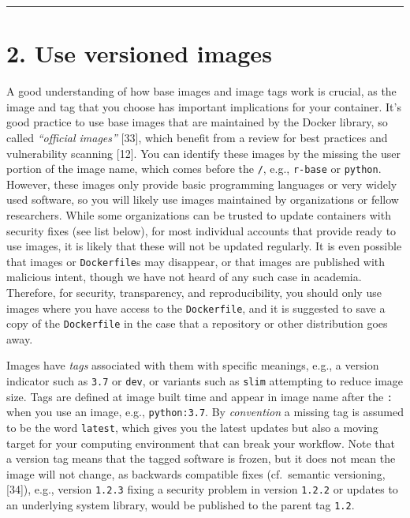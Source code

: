 \documentclass[10pt,letterpaper]{article}
\begin{document}
\begin{center}\rule{0.5\linewidth}{0.5pt}\end{center}

\hypertarget{use-versioned-images}{%
\section*{2. Use versioned images}\label{use-versioned-images}}

  \label{rule:base} 

A good understanding of how base images and image tags work is crucial,
as the image and tag that you choose has important implications for your
container. It's good practice to use base images that are maintained by
the Docker library, so called \emph{``official images''} {[}33{]}, which
benefit from a review for best practices and vulnerability scanning
{[}12{]}. You can identify these images by the missing the user portion
of the image name, which comes before the \texttt{/}, e.g.,
\texttt{r-base} or \texttt{python}. However, these images only provide
basic programming languages or very widely used software, so you will
likely use images maintained by organizations or fellow researchers.
While some organizations can be trusted to update containers with
security fixes (see list below), for most individual accounts that
provide ready to use images, it is likely that these will not be updated
regularly. It is even possible that images or \texttt{Dockerfile}s may
disappear, or that images are published with malicious intent, though we
have not heard of any such case in academia. Therefore, for security,
transparency, and reproducibility, you should only use images where you
have access to the \texttt{Dockerfile}, and it is suggested to save a
copy of the \texttt{Dockerfile} in the case that a repository or other
distribution goes away.

Images have \emph{tags} associated with them with specific meanings,
e.g., a version indicator such as \texttt{3.7} or \texttt{dev}, or
variants such as \texttt{slim} attempting to reduce image size. Tags are
defined at image built time and appear in image name after the
\texttt{:} when you use an image, e.g., \texttt{python:3.7}. By
\emph{convention} a missing tag is assumed to be the word
\texttt{latest}, which gives you the latest updates but also a moving
target for your computing environment that can break your workflow. Note
that a version tag means that the tagged software is frozen, but it does
not mean the image will not change, as backwards compatible fixes
(cf.~semantic versioning, {[}34{]}), e.g., version \texttt{1.2.3} fixing
a security problem in version \texttt{1.2.2} or updates to an underlying
system library, would be published to the parent tag \texttt{1.2}.
\end{document}
